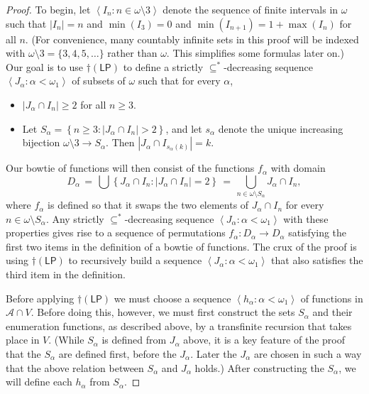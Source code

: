 \documentclass[10pt,a4paper]{amsart}
\newcommand{\A}{\mathcal{A}}
\renewcommand{\a}{\alpha}
\newcommand{\brackets}[1]{\left\langle #1 \right\rangle}
\newcommand{\cLP}{\dagger(\mathsf{LP})}
\newcommand{\card}[1]{\left\lvert #1 \right\rvert}
\newcommand{\explicitSet}[1]{\left\lbrace #1 \right\rbrace}
\newcommand{\seq}[2]{\brackets{#1 \colon #2}}
\newcommand{\set}[2]{\explicitSet{#1 \colon #2}}
\newcommand{\sub}{\subseteq}
\newcommand{\w}{\omega}
\begin{document}
\begin{proof}
To begin, let $\seq{I_n}{n \in \w \setminus 3}$ denote the sequence of finite intervals in $\w$ such that 
$|I_n| = n$ and $\min(I_3) = 0$ and $\min(I_{n+1}) = 1 + \max(I_n)$ for all $n$. 
(For convenience, many countably infinite sets in this proof will be indexed with $\w \setminus 3 = \{3,4,5,\dots\}$ rather than $\w$. This simplifies some formulas later on.) 
Our goal is to use $\cLP$ to define a strictly $\sub^*$-decreasing sequence $\seq{J_\a}{\a < \w_1}$ of subsets of $\w$ such that for every $\a$, 
\begin{itemize}
\item[$\circ$] $\card{J_\a \cap I_n} \geq 2$ for all $n \geq 3$.
\item[$\circ$] Let $S_\a = \set{n \geq 3}{\card{J_\a \cap I_n} > 2}$, and let $s_\a$ denote the unique increasing bijection $\w \setminus 3 \to S_\a$. Then $\card{J_\a \cap I_{s_\a(k)}} = k$.
\end{itemize}
Our bowtie of functions will then consist of the functions 
$f_\a$ 
with domain 
$$D_\a \,=\, \textstyle \bigcup \set{J_\a \cap I_n}{\card{J_\a \cap I_n} = 2} \,=\, \bigcup_{n \in \w \setminus S_\a}J_\a \cap I_n,$$
where $f_\a$ is defined so that it swaps the two elements of $J_\a \cap I_n$ for every $n \in \w \setminus S_\a$. 
Any strictly $\sub^*$-decreasing sequence $\seq{J_\a}{\a < \w_1}$ with these properties gives rise to a sequence of permutations $f_\a: D_\a \to D_\a$ satisfying the first two items in the definition of a bowtie of functions. 
The crux of the proof is using $\cLP$ to recursively build a sequence $\seq{J_\a}{\a < \w_1}$ that also satisfies the third item in the definition. 

Before applying $\cLP$ we must choose a sequence $\seq{h_\a}{\a < \w_1}$ of functions in $\A \cap V$. 
Before doing this, however, we must first construct the sets $S_\a$ and their enumeration functions, as described above, by a transfinite recursion that takes place in $V$. 
(While $S_\a$ is defined from $J_\a$ above, it is a key feature of the proof that the $S_\a$ are defined first, before the $J_\a$. Later the $J_\a$ are chosen in such a way that the above relation between $S_\a$ and $J_\a$ holds.) 
After constructing the $S_\a$, we will define each $h_\a$ from $S_\a$. 


\end{proof}
\end{document}
